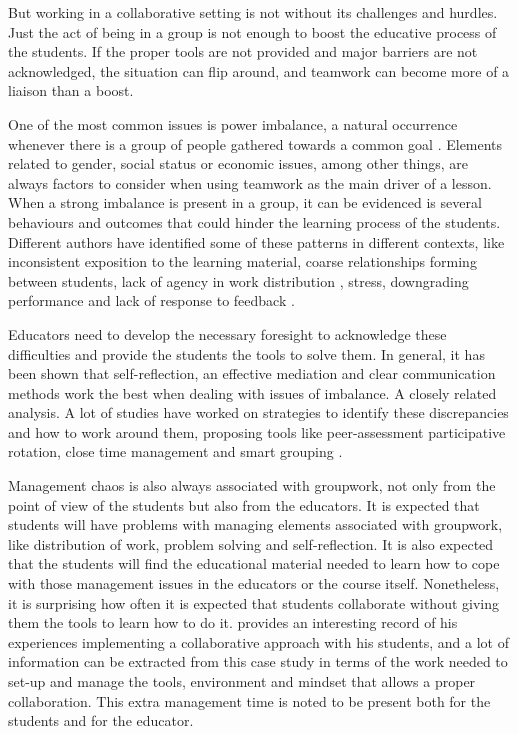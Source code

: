 But working in a collaborative setting is not without its challenges and hurdles. Just the act of being in a group is not enough to boost the educative process of the students. If the proper tools are not provided and major barriers are not acknowledged, the situation can flip around,
and teamwork can become more of a liaison than a boost.

One of the most common issues is power imbalance, a natural occurrence whenever there is a group of people gathered towards a common goal \parencite{essabbar_2015}. Elements related to gender, social status or economic issues, among other things, are always factors to consider when using
teamwork as the main driver of a lesson. When a strong imbalance is present in a group, it can be evidenced is several behaviours and outcomes that could hinder the learning process of the students. Different authors have identified some of these patterns in different contexts, like
inconsistent exposition to the learning material, coarse relationships forming between students, lack of agency in work distribution \parencite{griffin_2015}, stress, downgrading performance and lack of response to feedback \parencite{van-der-vegt_2010}.

Educators need to develop the necessary foresight to acknowledge these difficulties and provide the students the tools to solve them. In general, it has been shown that self-reflection, an effective mediation and clear communication methods work the best when dealing with issues of imbalance.
A closely related analysis. A lot of studies have worked on strategies to identify these discrepancies and how to work around them, proposing tools like peer-assessment \parencite{rezaei_2018} participative rotation, close time management \parencite{davies_2009} and smart grouping \parencite{akhrif_2019,wang_2009}.

Management chaos is also always associated with groupwork, not only from the point of view of the students but also from the educators. It is expected that students will have problems with managing elements associated with groupwork, like distribution of work, problem solving and self-reflection.
It is also expected that the students will find the educational material needed to learn how to cope with those management issues in the educators or the course itself. Nonetheless, it is surprising how often it is expected that students collaborate without giving them the tools to learn how to do
it. \textcite{bruffee_1973} provides an interesting record of his experiences implementing a collaborative approach with his students, and a lot of information can be extracted from this case study in terms of the work needed to set-up and manage the tools, environment and mindset that allows a
proper collaboration. This extra management time is noted to be present both for the students and for the educator.

